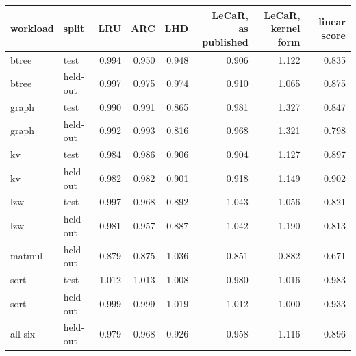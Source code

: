 \begin{tabular}{llrrrrrr}
\toprule
workload & split & LRU & ARC & LHD & \shortstack[r]{LeCaR,\\as published} & \shortstack[r]{LeCaR,\\kernel form} & linear score \\
\midrule
btree & test & 0.994 & 0.950 & 0.948 & 0.906 & 1.122 & 0.835 \\
btree & held-out & 0.997 & 0.975 & 0.974 & 0.910 & 1.065 & 0.875 \\
graph & test & 0.990 & 0.991 & 0.865 & 0.981 & 1.327 & 0.847 \\
graph & held-out & 0.992 & 0.993 & 0.816 & 0.968 & 1.321 & 0.798 \\
kv & test & 0.984 & 0.986 & 0.906 & 0.904 & 1.127 & 0.897 \\
kv & held-out & 0.982 & 0.982 & 0.901 & 0.918 & 1.149 & 0.902 \\
lzw & test & 0.997 & 0.968 & 0.892 & 1.043 & 1.056 & 0.821 \\
lzw & held-out & 0.981 & 0.957 & 0.887 & 1.042 & 1.190 & 0.813 \\
matmul & held-out & 0.879 & 0.875 & 1.036 & 0.851 & 0.882 & 0.671 \\
sort & test & 1.012 & 1.013 & 1.008 & 0.980 & 1.016 & 0.983 \\
sort & held-out & 0.999 & 0.999 & 1.019 & 1.012 & 1.000 & 0.933 \\
all six & held-out & 0.979 & 0.968 & 0.926 & 0.958 & 1.116 & 0.896 \\
\bottomrule
\end{tabular}
